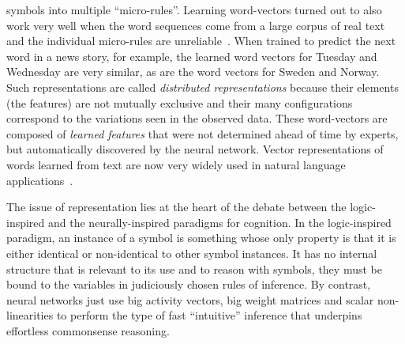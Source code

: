\documentclass[10pts]{article}
\newcommand{\citep}[1]{\cite{#1}}
\begin{document}
symbols into multiple ``micro-rules''.  
%
Learning word-vectors turned out to also
work very well when the word sequences come from a large corpus of
real text and the individual micro-rules are
unreliable~\citep{BenDucVin01-short}. When trained to predict the next
word in a news story, for example, the learned word vectors for
Tuesday and Wednesday are very similar, as are the word vectors for
Sweden and Norway.
Such representations are called {\em
  distributed representations} because their elements (the features) are
not mutually exclusive and their many configurations
correspond to
the variations seen in the observed data.  These word-vectors are
composed of
{\em learned features} that were not determined ahead of time by
experts, but automatically discovered by the neural network.  Vector
representations of words learned from text are now very widely used in
natural language
applications~\citep{Schwenk-2007,collobert:2011b,Socher-2011,
  Mikolov-et-al-NIPS2013,Bahdanau-et-al-ICLR2015-small,Sutskever-et-al-NIPS2014}.

The issue of representation lies at the heart of the debate between
the logic-inspired and the neurally-inspired paradigms for
cognition. In the logic-inspired paradigm, an instance of a symbol is
something whose only property is that it is either identical or
non-identical to other symbol instances. It has no internal structure
that is relevant to its use and  to reason with symbols, they must be
bound to the variables in judiciously chosen rules of inference.  By
contrast, neural networks just use big activity vectors, big weight
matrices and scalar non-linearities to perform the type of fast
``intuitive'' inference that underpins effortless commonsense
reasoning.
\end{document}
